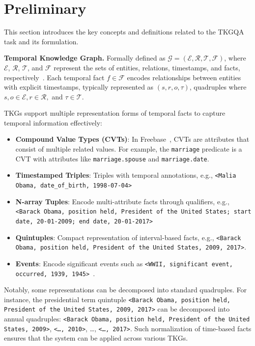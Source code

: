 \section{Preliminary}\label{sec-pre}
This section introduces the key concepts and definitions related to the TKGQA task and its formulation.

\noindent\textbf{Temporal Knowledge Graph.}  Formally defined as $\mathcal{G} =  (\mathcal{E}, \mathcal{R}, \mathcal{T}, \mathcal{F})$, where $\mathcal{E}$, $\mathcal{R}$, $\mathcal{T}$, and $\mathcal{F}$ represent the sets of entities, relations, timestamps, and facts, respectively~\cite{caiSurveyTemporalKnowledge2024}. Each temporal fact \( f \in \mathcal{F} \) encodes relationships between entities with explicit timestamps, typically represented as $(s,r,o, \tau)$, quadruples where $s,o\in \mathcal{E}, r\in \mathcal{R},$ and $\tau\in\mathcal{T}$.

TKGs support multiple representation forms of temporal facts to capture temporal information effectively:
\begin{itemize}
\item \textbf{Compound Value Types (CVTs)}: In Freebase~\cite{bollackerFreebaseCollaborativelyCreated2008}, CVTs are attributes that consist of multiple related values. For example, the \texttt{marriage} predicate is a CVT with attributes like \texttt{marriage.spouse} and \texttt{marriage.date}.
\item \textbf{Timestamped Triples}: Triples with temporal annotations, e.g., \texttt{<Malia Obama, date\_of\_birth, 1998-07-04>}
\item \textbf{N-array Tuples}: Encode multi-attribute facts through qualifiers, e.g., \texttt{<Barack Obama, position held, President of the United States; start date, 20-01-2009; end date, 20-01-2017>}
\item \textbf{Quintuples}: Compact representation of interval-based facts, e.g., \texttt{<Barack Obama, position held, President of the United States, 2009, 2017>}. 
\item \textbf{Events}: Encode significant events such as \texttt{<WWII, significant event, occurred, 1939, 1945>}~\cite{saxenaQuestionAnsweringTemporal2021}.
\end{itemize}

Notably, some representations can be decomposed into standard quadruples. For instance, the presidential term quintuple \texttt{<Barack Obama, position held, President of the United States, 2009, 2017>} can be decomposed into annual quadruples: \texttt{<Barack Obama, position held, President of the United States, 2009>}, \texttt{<…, 2010>}, …, \texttt{<…, 2017>}. Such normalization of time-based facts ensures that the system can be applied across various TKGs.


